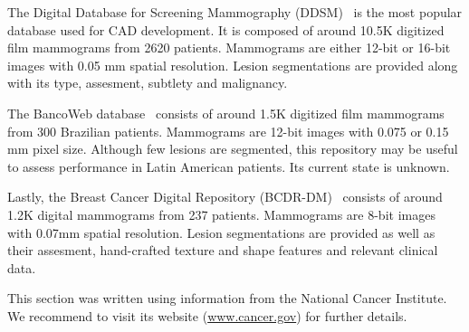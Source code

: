 The Digital Database for Screening Mammography (DDSM)~\cite{Heath2001} is the most popular database used for CAD development. It is composed of around 10.5K digitized film mammograms from 2620 patients. Mammograms are either 12-bit or 16-bit images with 0.05 mm spatial resolution. Lesion segmentations are provided along with its type, assesment, subtlety and malignancy.%

The BancoWeb database~\cite{Nepomuceno2011} consists of around 1.5K digitized film mammograms from 300 Brazilian patients. Mammograms are 12-bit images with 0.075 or 0.15 mm pixel size. Although few lesions are segmented, this repository may be useful to assess performance in Latin American patients. Its current state is unknown.

Lastly, the Breast Cancer Digital Repository (BCDR-DM)~\cite{Moura2013a, Moura2013b} consists of around 1.2K digital mammograms from 237 patients. Mammograms are 8-bit images with 0.07mm spatial resolution.
Lesion segmentations are provided as well as their assesment, hand-crafted texture and shape features and relevant clinical data.

This section was written using information from the National Cancer Institute. We recommend to visit its website (\url{www.cancer.gov}) for further details.
